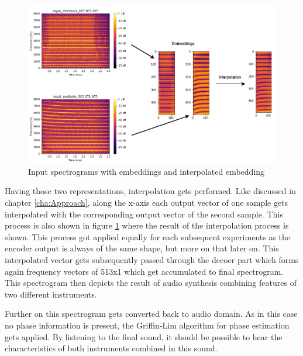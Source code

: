  \begin{figure}[htb!]
	\caption{Input spectrograms with embeddings and interpolated embedding}
	\label{fig:exp_spec_emb_int_1D}
	\centering
	\includegraphics[width=\textwidth]{images/experiments/spec_to_emb.png}
\end{figure}

Having those two representations, interpolation gets performed. Like discussed in chapter \ref{cha:Approach}, along the x-axis each output vector of one sample gets interpolated with the corresponding output vector of the second sample. This process is also shown in figure \ref{fig:exp_spec_emb_int_1D} where the result of the interpolation process is shown. This process got applied equally for each subsequent experiments as the encoder output is always of the same shape, but more on that later on.
This interpolated vector gets subsequently passed through the decoer part which forms again frequency vectors of 513x1 which get accumulated to final spectrogram. This spectrogram then depicts the result of audio synthesis combining features of two different instruments.

Further on this spectrogram gets converted back to audio domain. As in this case no phase information is present, the Griffin-Lim algorithm \cite{Griffin1984} for phase estimation gets applied. By listening to the final sound, it should be possible to hear the characteristics of both instruments combined in this sound.


